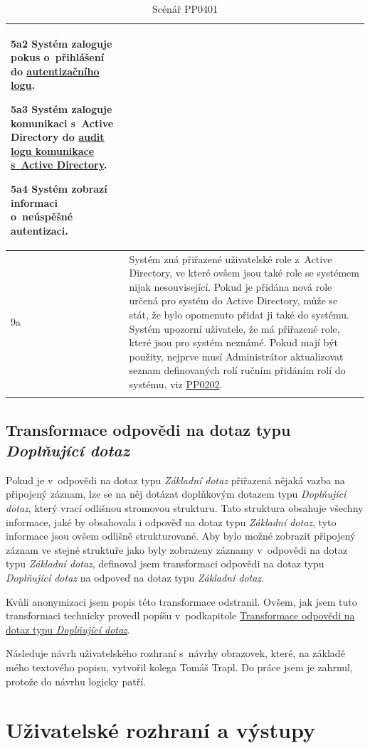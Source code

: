 \documentclass[thesis=M,czech]{FITthesis}[2019/12/23]
\begin{document}
\begin{longtable}{|p{}|p{}|}
  		5a2 Systém zaloguje pokus o~přihlášení do \hyperref[Logy]{autentizačního logu}.
  		
  		5a3 Systém zaloguje komunikaci s~Active Directory do \hyperref[Logy]{audit logu komunikace s~Active Directory}.
  		
  		5a4 Systém zobrazí informaci o~neúspěšné autentizaci. \\ \hline
  		9a & Systém zná přiřazené uživatelské role z~Active Directory, ve které ovšem jsou také role se systémem nijak nesouvisející. Pokud je přidána nová role určená pro systém do Active Directory, může se stát, že bylo opomenuto přidat ji také do systému. Systém upozorní uživatele, že má přiřazené role, které jsou pro systém neznámé. Pokud mají být použity, nejprve musí Administrátor aktualizovat seznam definovaných rolí ručním přidáním rolí do systému, viz \hyperref[PP0202]{PP0202}. \\ \hline
  		\caption{Scénář PP0401}
		\label{tab:Scénář PP0401}
	\end{longtable}

\subsection{Transformace odpovědi na dotaz typu \textit{Doplňující dotaz}}
\label{cqrd}
Pokud je v~odpovědi na dotaz typu \textit{Základní dotaz} přiřazená nějaká vazba na připojený záznam, lze se na něj dotázat doplňkovým dotazem typu \textit{Doplňující dotaz}, který vrací odlišnou stromovou strukturu. Tato struktura obsahuje všechny informace, jaké by obsahovala i odpověď na dotaz typu \textit{Základní dotaz}, tyto informace jsou ovšem odlišně strukturované.  Aby bylo možné zobrazit připojený záznam ve stejné struktuře jako byly zobrazeny záznamy v~odpovědi na dotaz typu \textit{Základní dotaz}, definoval jsem transformaci odpovědi na dotaz typu \textit{Doplňující dotaz} na odpoveď na dotaz typu \textit{Základní dotaz}.

Kvůli anonymizaci jsem popis této transformace odstranil. Ovšem, jak jsem tuto transformaci technicky provedl popíšu v~podkapitole \hyperref[Transf]{Transformace odpovědi na dotaz typu \textit{Doplňující dotaz}}.

Následuje návrh uživatelského rozhraní s~návrhy obrazovek, které, na základě mého textového popisu, vytvořil kolega Tomáš Trapl. Do práce jsem je zahrnul, protože do návrhu logicky patří.

\section{Uživatelské rozhraní a výstupy}
\end{document}
